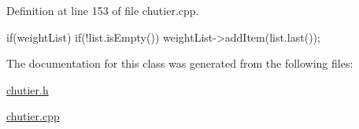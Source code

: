 \-Definition at line 153 of file chutier.\-cpp.


\begin{DoxyCode}
                                       {
    if(weightList)
    {
        if(!list.isEmpty())
            weightList->addItem(list.last());
    }
}
\end{DoxyCode}


\-The documentation for this class was generated from the following files\-:\begin{DoxyCompactItemize}
\item 
\hyperlink{chutier_8h}{chutier.\-h}\item 
\hyperlink{chutier_8cpp}{chutier.\-cpp}\end{DoxyCompactItemize}
